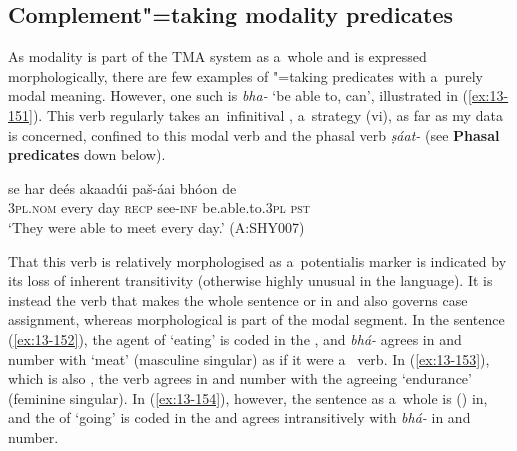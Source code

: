 \subsection{Complement"=taking modality predicates}
\label{subsec:13-5-2}

 As modality is part of the TMA system as a~whole and is expressed morphologically, there are few examples of "=taking predicates with a~purely modal meaning. However, one such  is \textit{bha-} `be able to, can', illustrated in (\ref{ex:13-151}). This verb regularly takes an~infinitival , a~strategy (vi), as far as my data is concerned, confined to this modal verb and the phasal verb \textit{ṣáat-} (see \textbf{Phasal predicates} down below).

\begin{exe}
\ex
\label{ex:13-151}
\gll se har deés akaadúi paš-áai bhóon de  \\
\textsc{3pl.nom} every day \textsc{recp} see-\textsc{inf} be.able.to.\textsc{3pl} \textsc{pst} \\
\glt `They were able to meet every day.' (A:SHY007) 
\end{exe}

That this verb is relatively morphologised as a~potentialis marker is indicated by its loss of inherent transitivity (otherwise highly unusual in the language). It is instead the  verb that makes the whole sentence  or in and also governs case assignment, whereas morphological  is part of the modal segment. In the   sentence (\ref{ex:13-152}), the agent of `eating' is coded in the , and \textit{bhá-} agrees in  and number with `meat' (masculine singular) as if it were a~ verb. In (\ref{ex:13-153}), which is also  , the verb agrees in  and number with the agreeing  `endurance' (feminine singular). In (\ref{ex:13-154}), however, the sentence as a~whole is () in, and the  of `going' is coded in the  and agrees intransitively with \textit{bhá-} in  and number.

